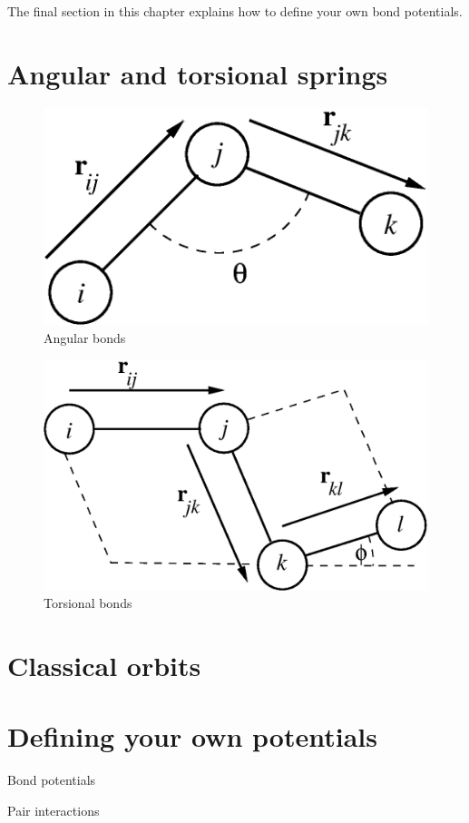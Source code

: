 The final section in this chapter explains how to define your own bond
potentials.

\section{Angular and torsional springs}

\begin{figure}
  \centering
  \includegraphics[width = 0.5 \textwidth]{figures/angularSprings.eps}
  \caption{\label{angularBonds}Angular bonds}
\end{figure}

\begin{figure}
  \centering
  \includegraphics[width = 0.6 \textwidth]{figures/torsionalSprings.eps}
  \caption{\label{torsionalBonds}Torsional bonds}
\end{figure}

\section{Classical orbits}

\section{Defining your own potentials}

Bond potentials

Pair interactions

